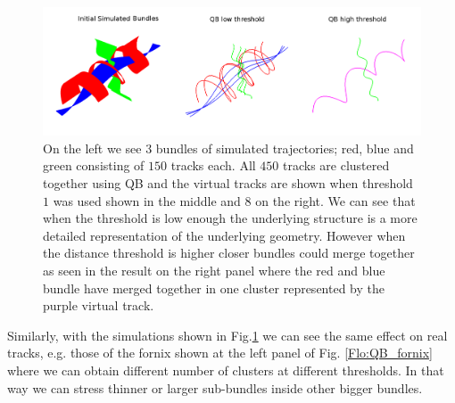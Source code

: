 \documentclass[preprint,authoryear,a4paper,10pt,onecolumn]{elsarticle}
\begin{document}
%
\begin{figure}
\begin{centering}
\includegraphics[scale=0.7]{last_figures/helix_phantom}
\par\end{centering}
\caption{On the left we see $3$ bundles of simulated trajectories; red,
  blue and green consisting of $150$ tracks each. All $450$ tracks are
  clustered together using QB and the virtual tracks are shown when
  threshold $1$ was used shown in the middle and $8$ on the right.  We
  can see that when the threshold is low enough the underlying structure
  is a more detailed representation of the underlying geometry. However
  when the distance threshold is higher closer bundles could merge
  together as seen in the result on the right panel where the red and
  blue bundle have merged together in one cluster represented by the
  purple virtual track.\label{Flo:simulated_orbits}}
\end{figure}

Similarly, with the simulations shown in Fig.\ref{Flo:simulated_orbits}
we can see the same effect on real tracks, e.g. those of the fornix
shown at the left panel of Fig. \ref{Flo:QB_fornix} where we can obtain
different number of clusters at different thresholds. In that way we can
stress thinner or larger sub-bundles inside other bigger bundles.
\end{document}
